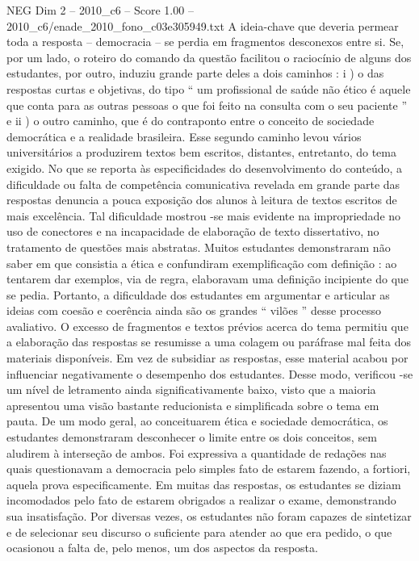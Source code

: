 \begin{textsample}{NEG Dim 2 – 2010\_c6 – Score 1.00 – 2010\_c6/enade\_2010\_fono\_c03e305949.txt}
A ideia-chave que deveria permear toda a resposta – democracia – se perdia em fragmentos desconexos entre si.
Se, por um lado, o roteiro do comando da questão facilitou o raciocínio de alguns dos estudantes, por outro, induziu grande parte deles a dois caminhos : i ) o das respostas curtas e objetivas, do tipo “ um profissional de saúde não ético é aquele que conta para as outras pessoas o que foi feito na consulta com o seu paciente ” e ii ) o outro caminho, que é do contraponto entre o conceito de sociedade democrática e a realidade brasileira.
Esse segundo caminho levou vários universitários a produzirem textos bem escritos, distantes, entretanto, do tema exigido.
No que se reporta às especificidades do desenvolvimento do conteúdo, a dificuldade ou falta de competência comunicativa revelada em grande parte das respostas denuncia a pouca exposição dos alunos à leitura de textos escritos de mais excelência.
Tal dificuldade mostrou -se mais evidente na impropriedade no uso de conectores e na incapacidade de elaboração de texto dissertativo, no tratamento de questões mais abstratas.
Muitos estudantes demonstraram não saber em que consistia a ética e confundiram exemplificação com definição : ao tentarem dar exemplos, via de regra, elaboravam uma definição incipiente do que se pedia.
Portanto, a dificuldade dos estudantes em argumentar e articular as ideias com coesão e coerência ainda são os grandes “ vilões ” desse processo avaliativo.
O excesso de fragmentos e textos prévios acerca do tema permitiu que a elaboração das respostas se resumisse a uma colagem ou paráfrase mal feita dos materiais disponíveis.
Em vez de subsidiar as respostas, esse material acabou por influenciar negativamente o desempenho dos estudantes.
Desse modo, verificou -se um nível de letramento ainda significativamente baixo, visto que a maioria apresentou uma visão bastante reducionista e simplificada sobre o tema em pauta.
De um modo geral, ao conceituarem ética e sociedade democrática, os estudantes demonstraram desconhecer o limite entre os dois conceitos, sem aludirem à interseção de ambos.
Foi expressiva a quantidade de redações nas quais questionavam a democracia pelo simples fato de estarem fazendo, a fortiori, aquela prova especificamente.
Em muitas das respostas, os estudantes se diziam incomodados pelo fato de estarem obrigados a realizar o exame, demonstrando sua insatisfação.
Por diversas vezes, os estudantes não foram capazes de sintetizar e de selecionar seu discurso o suficiente para atender ao que era pedido, o que ocasionou a falta de, pelo menos, um dos aspectos da resposta.

\end{textsample}
